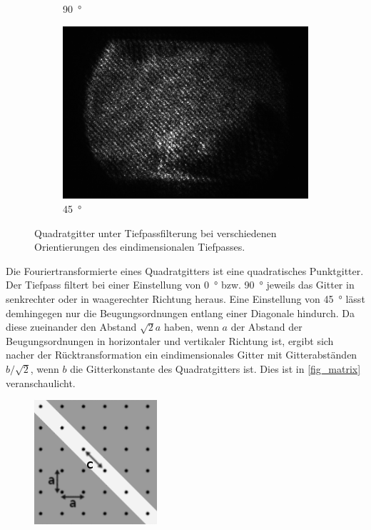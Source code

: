 \documentclass[
	a4paper,
	12pt,
	pagesize,
	ngerman
]{scrartcl}
\begin{document}
\begin{itemize}
\begin{figure}[H]
\begin{subfigure}[b]{0.475\textwidth}
            \caption[]%
            {\SI{90}{\degree}}
            \label{fig_4_quad_90}
        \end{subfigure}
				\begin{subfigure}[b]{0.475\textwidth}
            \centering
            \includegraphics[width=\textwidth]{raw/4/4_quad_spaltdiagonal_crop}
            \caption%
            {\SI{45}{\degree}}
            \label{fig_4_quad_45}
        \end{subfigure}
        \caption%
        {
					Quadratgitter unter Tiefpassfilterung bei verschiedenen Orientierungen des eindimensionalen Tiefpasses.
				}
        \label{fig_4_quad}
    \end{figure}
	Die Fouriertransformierte eines Quadratgitters ist eine quadratisches Punktgitter.
	Der Tiefpass filtert bei einer Einstellung von \SI{0}{\degree} bzw. \SI{90}{\degree} jeweils das Gitter in senkrechter oder in waagerechter Richtung heraus.
	Eine Einstellung von \SI{45}{\degree} lässt demhingegen nur die Beugungsordnungen entlang einer Diagonale hindurch.
	Da diese zueinander den Abstand $\sqrt{2}a$ haben, wenn $a$ der Abstand der Beugungsordnungen in horizontaler und vertikaler Richtung ist, ergibt sich nacher der Rücktransformation ein eindimensionales Gitter mit Gitterabständen $b/\sqrt{2}$, wenn $b$ die Gitterkonstante des Quadratgitters ist.
	Dies ist in \cref{fig_matrix} veranschaulicht.
	\begin{figure}[H]
			\includegraphics[width=0.5\linewidth]{img/matrix}

\end{figure}
\end{itemize}
\end{document}
